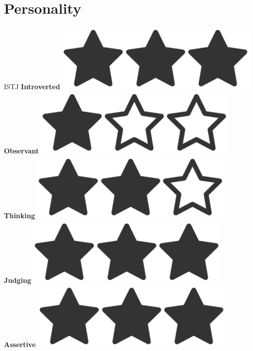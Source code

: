 \documentclass[]{friggeri-cv}
\begin{document}
\newpage

\begin{aside}
~
~
~
  \section{Personality}
  	{ISTJ}
    \textbf{Introverted  }\includegraphics[scale=0.07]{img/3heart.png}
    \textbf{Observant  }\includegraphics[scale=0.07]{img/1heart.png}
    \textbf{Thinking  }\includegraphics[scale=0.07]{img/2heart.png}
    \textbf{Judging  }\includegraphics[scale=0.07]{img/3heart.png}
    \textbf{Assertive  }\includegraphics[scale=0.07]{img/3heart.png}    
    ~

\end{aside}
\end{document}
